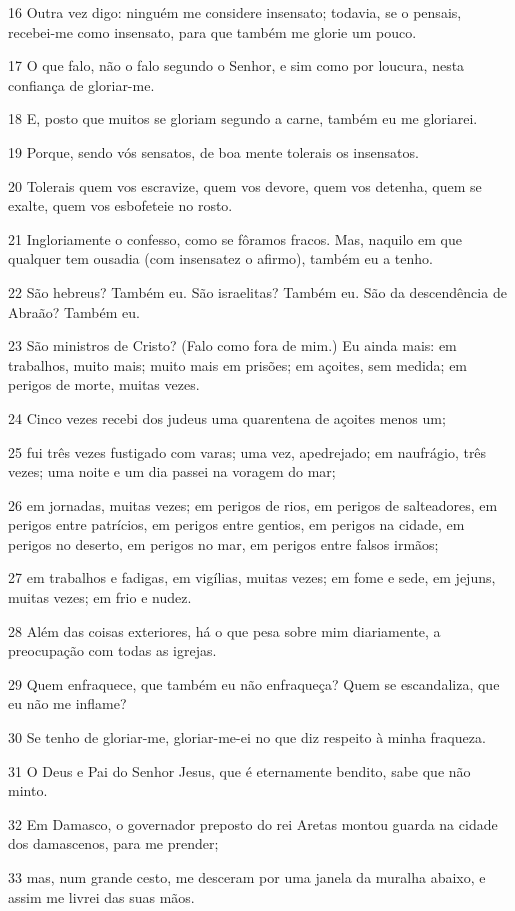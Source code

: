 \par 16 Outra vez digo: ninguém me considere insensato; todavia, se o pensais, recebei-me como insensato, para que também me glorie um pouco.
\par 17 O que falo, não o falo segundo o Senhor, e sim como por loucura, nesta confiança de gloriar-me.
\par 18 E, posto que muitos se gloriam segundo a carne, também eu me gloriarei.
\par 19 Porque, sendo vós sensatos, de boa mente tolerais os insensatos.
\par 20 Tolerais quem vos escravize, quem vos devore, quem vos detenha, quem se exalte, quem vos esbofeteie no rosto.
\par 21 Ingloriamente o confesso, como se fôramos fracos. Mas, naquilo em que qualquer tem ousadia (com insensatez o afirmo), também eu a tenho.
\par 22 São hebreus? Também eu. São israelitas? Também eu. São da descendência de Abraão? Também eu.
\par 23 São ministros de Cristo? (Falo como fora de mim.) Eu ainda mais: em trabalhos, muito mais; muito mais em prisões; em açoites, sem medida; em perigos de morte, muitas vezes.
\par 24 Cinco vezes recebi dos judeus uma quarentena de açoites menos um;
\par 25 fui três vezes fustigado com varas; uma vez, apedrejado; em naufrágio, três vezes; uma noite e um dia passei na voragem do mar;
\par 26 em jornadas, muitas vezes; em perigos de rios, em perigos de salteadores, em perigos entre patrícios, em perigos entre gentios, em perigos na cidade, em perigos no deserto, em perigos no mar, em perigos entre falsos irmãos;
\par 27 em trabalhos e fadigas, em vigílias, muitas vezes; em fome e sede, em jejuns, muitas vezes; em frio e nudez.
\par 28 Além das coisas exteriores, há o que pesa sobre mim diariamente, a preocupação com todas as igrejas.
\par 29 Quem enfraquece, que também eu não enfraqueça? Quem se escandaliza, que eu não me inflame?
\par 30 Se tenho de gloriar-me, gloriar-me-ei no que diz respeito à minha fraqueza.
\par 31 O Deus e Pai do Senhor Jesus, que é eternamente bendito, sabe que não minto.
\par 32 Em Damasco, o governador preposto do rei Aretas montou guarda na cidade dos damascenos, para me prender;
\par 33 mas, num grande cesto, me desceram por uma janela da muralha abaixo, e assim me livrei das suas mãos.

